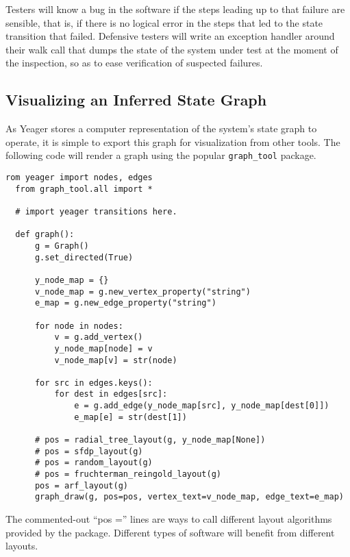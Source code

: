 Testers will know a bug in the software if the steps leading up to that failure are sensible, that is, if there is no logical error in the steps that led to the state transition that failed. Defensive testers will write an exception handler around their walk call that dumps the state of the system under test at the moment of the inspection, so as to ease verification of suspected failures.

\subsection{Visualizing an Inferred State Graph}

As Yeager stores a computer representation of the system's state graph to operate, it is simple to export this graph for visualization from other tools. The following code will render a graph using the popular \texttt{graph\_tool} package.

\begin{Verbatim}[fontsize=\small]
  rom yeager import nodes, edges
  from graph_tool.all import *

  # import yeager transitions here.

  def graph():
      g = Graph()
      g.set_directed(True)

      y_node_map = {}
      v_node_map = g.new_vertex_property("string")
      e_map = g.new_edge_property("string")

      for node in nodes:
          v = g.add_vertex()
          y_node_map[node] = v
          v_node_map[v] = str(node)

      for src in edges.keys():
          for dest in edges[src]:
              e = g.add_edge(y_node_map[src], y_node_map[dest[0]])
              e_map[e] = str(dest[1])

      # pos = radial_tree_layout(g, y_node_map[None])
      # pos = sfdp_layout(g)
      # pos = random_layout(g)
      # pos = fruchterman_reingold_layout(g)
      pos = arf_layout(g)
      graph_draw(g, pos=pos, vertex_text=v_node_map, edge_text=e_map)
\end{Verbatim}

The commented-out ``pos ='' lines are ways to call different layout algorithms provided by the package. Different types of software will benefit from different layouts.


